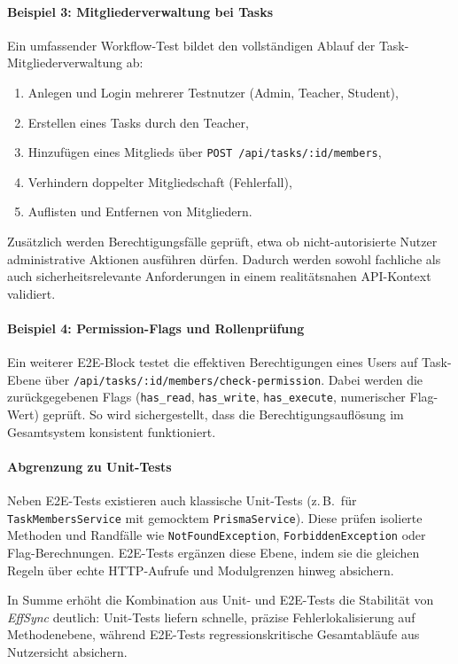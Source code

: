 \paragraph{Beispiel 3: Mitgliederverwaltung bei Tasks}
Ein umfassender Workflow-Test bildet den vollständigen Ablauf der Task-Mitgliederverwaltung ab:
\begin{enumerate}
    \item Anlegen und Login mehrerer Testnutzer (Admin, Teacher, Student),
    \item Erstellen eines Tasks durch den Teacher,
    \item Hinzufügen eines Mitglieds über \texttt{POST /api/tasks/:id/members},
    \item Verhindern doppelter Mitgliedschaft (Fehlerfall),
    \item Auflisten und Entfernen von Mitgliedern.
\end{enumerate}
Zusätzlich werden Berechtigungsfälle geprüft, etwa ob nicht-autorisierte Nutzer administrative Aktionen ausführen dürfen. Dadurch werden sowohl fachliche als auch sicherheitsrelevante Anforderungen in einem realitätsnahen API-Kontext validiert.

\paragraph{Beispiel 4: Permission-Flags und Rollenprüfung}
Ein weiterer E2E-Block testet die effektiven Berechtigungen eines Users auf Task-Ebene über \texttt{/api/tasks/:id/members/check-permission}. Dabei werden die zurückgegebenen Flags (\texttt{has\_read}, \texttt{has\_write}, \texttt{has\_execute}, numerischer Flag-Wert) geprüft. So wird sichergestellt, dass die Berechtigungsauflösung im Gesamtsystem konsistent funktioniert.

\paragraph{Abgrenzung zu Unit-Tests}
Neben E2E-Tests existieren auch klassische Unit-Tests (z.\,B.\ für \texttt{TaskMembersService} mit gemocktem \texttt{PrismaService}). Diese prüfen isolierte Methoden und Randfälle wie \texttt{NotFoundException}, \texttt{ForbiddenException} oder Flag-Berechnungen. E2E-Tests ergänzen diese Ebene, indem sie die gleichen Regeln über echte HTTP-Aufrufe und Modulgrenzen hinweg absichern.

In Summe erhöht die Kombination aus Unit- und E2E-Tests die Stabilität von \textit{EffSync} deutlich: Unit-Tests liefern schnelle, präzise Fehlerlokalisierung auf Methodenebene, während E2E-Tests regressionskritische Gesamtabläufe aus Nutzersicht absichern.

